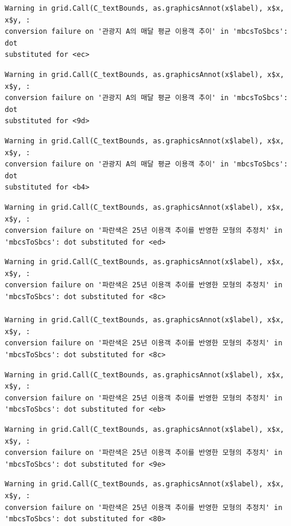 \documentclass[
  letterpaper,
  DIV=11,
  numbers=noendperiod]{scrreprt}
\begin{document}
\begin{verbatim}
Warning in grid.Call(C_textBounds, as.graphicsAnnot(x$label), x$x, x$y, :
conversion failure on '관광지 A의 매달 평균 이용객 추이' in 'mbcsToSbcs': dot
substituted for <ec>
\end{verbatim}

\begin{verbatim}
Warning in grid.Call(C_textBounds, as.graphicsAnnot(x$label), x$x, x$y, :
conversion failure on '관광지 A의 매달 평균 이용객 추이' in 'mbcsToSbcs': dot
substituted for <9d>
\end{verbatim}

\begin{verbatim}
Warning in grid.Call(C_textBounds, as.graphicsAnnot(x$label), x$x, x$y, :
conversion failure on '관광지 A의 매달 평균 이용객 추이' in 'mbcsToSbcs': dot
substituted for <b4>
\end{verbatim}

\begin{verbatim}
Warning in grid.Call(C_textBounds, as.graphicsAnnot(x$label), x$x, x$y, :
conversion failure on '파란색은 25년 이용객 추이를 반영한 모형의 추정치' in
'mbcsToSbcs': dot substituted for <ed>
\end{verbatim}

\begin{verbatim}
Warning in grid.Call(C_textBounds, as.graphicsAnnot(x$label), x$x, x$y, :
conversion failure on '파란색은 25년 이용객 추이를 반영한 모형의 추정치' in
'mbcsToSbcs': dot substituted for <8c>

Warning in grid.Call(C_textBounds, as.graphicsAnnot(x$label), x$x, x$y, :
conversion failure on '파란색은 25년 이용객 추이를 반영한 모형의 추정치' in
'mbcsToSbcs': dot substituted for <8c>
\end{verbatim}

\begin{verbatim}
Warning in grid.Call(C_textBounds, as.graphicsAnnot(x$label), x$x, x$y, :
conversion failure on '파란색은 25년 이용객 추이를 반영한 모형의 추정치' in
'mbcsToSbcs': dot substituted for <eb>
\end{verbatim}

\begin{verbatim}
Warning in grid.Call(C_textBounds, as.graphicsAnnot(x$label), x$x, x$y, :
conversion failure on '파란색은 25년 이용객 추이를 반영한 모형의 추정치' in
'mbcsToSbcs': dot substituted for <9e>
\end{verbatim}

\begin{verbatim}
Warning in grid.Call(C_textBounds, as.graphicsAnnot(x$label), x$x, x$y, :
conversion failure on '파란색은 25년 이용객 추이를 반영한 모형의 추정치' in
'mbcsToSbcs': dot substituted for <80>
\end{verbatim}
\end{document}
